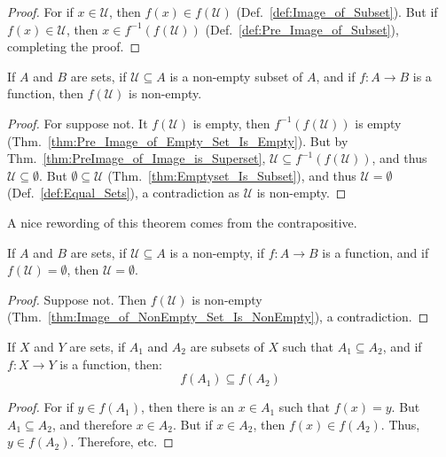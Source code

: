     \begin{proof}
        For if $x\in\mathcal{U}$, then $f(x)\in{f}(\mathcal{U})$
        (Def.~\ref{def:Image_of_Subset}). But if $f(x)\in\mathcal{U}$, then
        $x\in{f}^{\minus{1}}(f(\mathcal{U}))$
        (Def.~\ref{def:Pre_Image_of_Subset}), completing the proof.
    \end{proof}
    \begin{theorem}
        \label{thm:Image_of_NonEmpty_Set_Is_NonEmpty}%
        If $A$ and $B$ are sets, if $\mathcal{U}\subseteq{A}$ is a non-empty
        subset of $A$, and if $f:A\rightarrow{B}$ is a function, then
        $f(\mathcal{U})$ is non-empty.
    \end{theorem}
    \begin{proof}
        For suppose not. It $f(\mathcal{U})$ is empty, then
        $f^{\minus{1}}(f(\mathcal{U}))$ is empty
        (Thm.~\ref{thm:Pre_Image_of_Empty_Set_Is_Empty}). But by
        Thm.~\ref{thm:PreImage_of_Image_is_Superset},
        $\mathcal{U}\subseteq{f}^{\minus{1}}(f(\mathcal{U}))$, and thus
        $\mathcal{U}\subseteq\emptyset$. But $\emptyset\subseteq\mathcal{U}$
        (Thm.~\ref{thm:Emptyset_Is_Subset}), and thus $\mathcal{U}=\emptyset$
        (Def.~\ref{def:Equal_Sets}), a contradiction as $\mathcal{U}$ is
        non-empty.
    \end{proof}
    A nice rewording of this theorem comes from the contrapositive.
    \begin{theorem}
        If $A$ and $B$ are sets, if $\mathcal{U}\subseteq{A}$ is a non-empty,
        if $f:A\rightarrow{B}$ is a function, and if
        $f(\mathcal{U})=\emptyset$, then $\mathcal{U}=\emptyset$.
    \end{theorem}
    \begin{proof}
        Suppose not. Then $f(\mathcal{U})$ is non-empty
        (Thm.~\ref{thm:Image_of_NonEmpty_Set_Is_NonEmpty}), a contradiction.
    \end{proof}
    \begin{theorem}
        If $X$ and $Y$ are sets, if $A_{1}$ and $A_{2}$ are subsets of $X$ such
        that $A_{1}\subseteq{A}_{2}$, and if $f:X\rightarrow{Y}$ is a function,
        then:
        \begin{equation}
            f(A_{1})\subseteq{f}(A_{2})
        \end{equation}
    \end{theorem}
    \begin{proof}
        For if $y\in{f}(A_{1})$, then there is an $x\in{A}_{1}$
        such that $f(x)=y$. But $A_{1}\subseteq{A}_{2}$, and
        therefore $x\in{A}_{2}$. But if $x\in{A}_{2}$, then
        $f(x)\in{f}(A_{2})$. Thus, $y\in{f}(A_{2})$. Therefore, etc.
    \end{proof}
